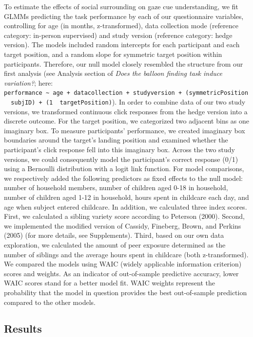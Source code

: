 \documentclass[
  man,floatsintext]{apa6}
\begin{document}
To estimate the effects of social surrounding on gaze cue understanding, we fit GLMMs predicting the task performance by each of our questionnaire variables, controlling for age (in months, z-transformed), data collection mode (reference category: in-person supervised) and study version (reference category: hedge version). The models included random intercepts for each participant and each target position, and a random slope for symmetric target position within participants. Therefore, our null model closely resembled the structure from our first analysis (see Analysis section of \emph{Does the balloon finding task induce variation?}; here: \texttt{performance\ \textasciitilde{}\ age\ +\ datacollection\ +\ studyversion\ +\ (symmetricPosition\ \textbar{}\ subjID)\ +\ (1\ \textbar{}\ targetPosition)}).
In order to combine data of our two study versions, we transformed continuous click responses from the hedge version into a discrete outcome. For the target position, we categorized two adjacent bins as one imaginary box. To measure participants' performance, we created imaginary box boundaries around the target's landing position and examined whether the participant's click response fell into this imaginary box. Across the two study versions, we could consequently model the participant's correct response (0/1) using a Bernoulli distribution with a logit link function.
For model comparisons, we respectively added the following predictors as fixed effects to the null model: number of household members, number of children aged 0-18 in household, number of children aged 1-12 in household, hours spent in childcare each day, and age when subject entered childcare.
In addition, we calculated three index scores. First, we calculated a sibling variety score according to Peterson (2000). Second, we implemented the modified version of Cassidy, Fineberg, Brown, and Perkins (2005) (for more details, see Supplements). Third, based on our own data exploration, we calculated the amount of peer exposure determined as the number of siblings and the average hours spent in childcare (both z-transformed).
We compared the models using WAIC (widely applicable information criterion) scores and weights. As an indicator of out-of-sample predictive accuracy, lower WAIC scores stand for a better model fit. WAIC weights represent the probability that the model in question provides the best out-of-sample prediction compared to the other models.

\hypertarget{results-2}{%
\subsection{Results}\label{results-2}}
\end{document}
